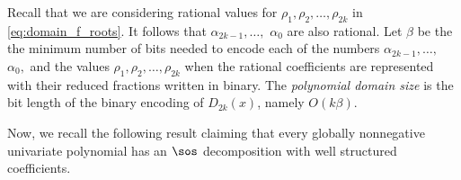 \documentclass[11pt]{article}
\begin{document}
Recall that we are considering rational values for $\rho_{1},\rho_{2},\ldots,\rho_{2k}$ in \eqref{eq:domain_f_roots}. It follows that $\alpha_{2k-1}, \ldots,$ $\alpha_0$ are also rational. Let $\beta$ be the the minimum number of bits needed to encode each of the numbers $\alpha_{2k-1}, \ldots,$ $\alpha_0,$  and the values $\rho_1, \rho_2, \dots, \rho_{2k}$ when the rational coefficients are represented with their reduced fractions written in binary.
The \emph{polynomial domain size} is the bit length of the binary encoding of $D_{2k}(x)$, namely $O(k\beta)$. %


Now, we recall the following result claiming that every globally nonnegative univariate polynomial has an $\sos$ decomposition with well structured coefficients.
\end{document}
